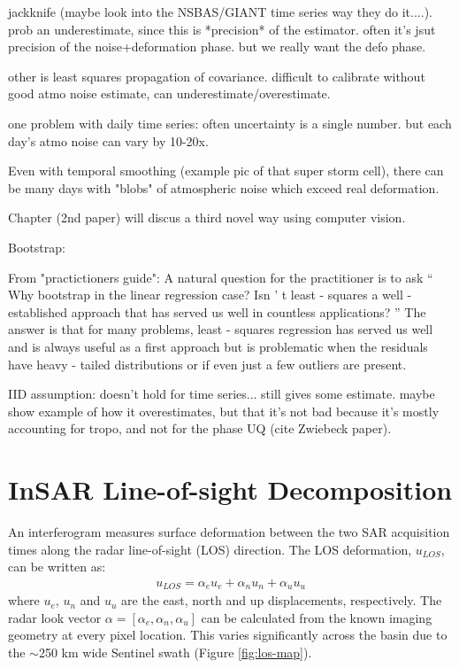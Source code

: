 \documentclass{utexasthesis}
\begin{document}
jackknife (maybe look into the NSBAS/GIANT time series way they do it....). prob an underestimate, since this is *precision* of the estimator. often it's jsut precision of the noise+deformation phase. but we really want the defo phase.

other is least squares propagation of covariance. difficult to calibrate without good atmo noise estimate, can underestimate/overestimate.

one problem with daily time series: often uncertainty is a single number. but each day's atmo noise can vary by 10-20x.

Even with temporal smoothing (example pic of that super storm cell), there can be many days with "blobs" of atmospheric noise which exceed real deformation.

Chapter (2nd paper) will discus a third novel way using computer vision.


Bootstrap:

From "practictioners guide":
A natural question for the practitioner is to ask  “ Why bootstrap in the linear regression case? Isn ’ t least - squares a well - established approach that  has  served  us  well  in  countless  applications? ”   The  answer  is  that  for  many  problems, least - squares regression has served us well and is always useful as  a first approach but is problematic when the residuals have heavy - tailed distributions or if even just a few outliers are present.

IID assumption: doesn't hold for time series... still gives some estimate. maybe show example of how it overestimates, but that it's not bad because it's mostly accounting for tropo, and not for the phase UQ (cite Zwiebeck paper).





\section{InSAR Line-of-sight Decomposition}
\label{sec:ch3-insar-decomp}
An interferogram measures surface deformation between the two SAR acquisition times along the radar line-of-sight (LOS) direction. The LOS deformation, $u_{LOS}$, can be written as: 
\begin{align}
	u_{LOS}= \alpha_{e} u_{e} + \alpha_{n} u_{n} + \alpha_{u} u_{u}
\end{align}
where $u_{e}$, $u_{n}$ and $u_{u}$ are the east, north and up displacements, respectively. The radar look vector $\alpha = [\alpha_e, \alpha_n, \alpha_u]$ can be calculated from the known imaging geometry at every pixel location. This varies significantly across the basin due to the $ \sim$250 km wide Sentinel swath (Figure \ref{fig:los-map}). 
\end{document}

